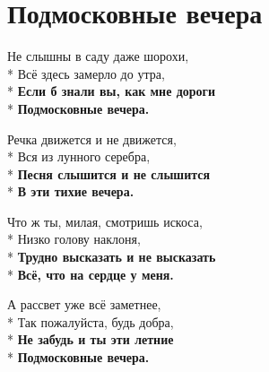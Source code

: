 \vspace{\fill}\newpage

\section{Подмосковные вечера}
\label{song:Подмосковные_вечера}

\medskip

\begin{minipage}{\linewidth}
Не слышны в саду даже шорохи,\\*
Всё здесь замерло до утра,\\*
\textbf{Если б знали вы, как мне дороги}\\*
\textbf{Подмосковные вечера.}\\
\end{minipage}\par\medskip\nobreak

\medskip

\begin{minipage}{\linewidth}
Речка движется и не движется,\\*
Вся из лунного серебра,\\*
\textbf{Песня слышится и не слышится}\\*
\textbf{В эти тихие вечера.}\\
\end{minipage}\par\medskip\nobreak

\medskip

\begin{minipage}{\linewidth}
Что ж ты, милая, смотришь искоса,\\*
Низко голову наклоня,\\*
\textbf{Трудно высказать и не высказать}\\*
\textbf{Всё, что на сердце у меня.}\\
\end{minipage}\par\medskip\nobreak

\medskip

\begin{minipage}{\linewidth}
А рассвет уже всё заметнее,\\*
Так пожалуйста, будь добра,\\*
\textbf{Не забудь и ты эти летние}\\*
\textbf{Подмосковные вечера. }\\
\end{minipage}

